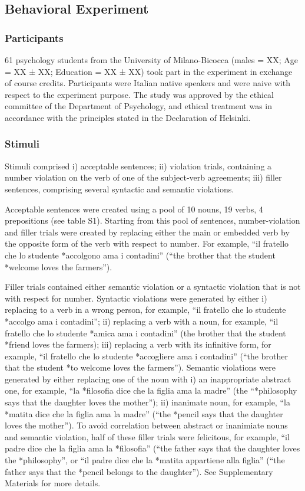 \subsection{Behavioral Experiment}
\subsubsection{Participants}
61 psychology students from the University of Milano-Bicocca (males = XX; Age = XX ± XX; Education = XX ± XX) took part in the experiment in exchange of course credits. Participants were Italian native speakers and were naive with respect to the experiment purpose. The study was approved by the ethical committee of the Department of Psychology, and ethical treatment was in accordance with the principles stated in the Declaration of Helsinki.

\subsubsection{Stimuli}
Stimuli comprised i) acceptable sentences; ii) violation trials, containing a number violation on the verb of one of the subject-verb agreements; iii) filler sentences, comprising several syntactic and semantic violations. 

Acceptable sentences were created using a pool of 10 nouns, 19 verbs, 4 prepositions (see table S1).
Starting from this pool of sentences, number-violation and filler trials were created by replacing either the main or embedded verb by the opposite form of the verb with respect to number. For example, ``il fratello che lo studente *accolgono ama i contadini'' (``the brother that the student *welcome loves the farmers'').

Filler trials contained either semantic violation or a syntactic violation that is not with respect for number. Syntactic violations were generated by either i) replacing to a verb in a wrong person, for example, ``il fratello che lo studente *accolgo ama i contadini''; ii) replacing a verb with a noun, for example, ``il fratello che lo studente *amica ama i contadini'' (the brother that the student *friend loves the farmers); iii) replacing a verb with its infinitive form, for example, ``il fratello che lo studente *accogliere ama i contadini'' (``the brother that the student *to welcome loves the farmers''). Semantic violations were generated by either replacing one of the noun with i) an inappropriate abstract one, for example, ``la *filosofia dice che la figlia ama la madre'' (the ``*philosophy says that the daughter loves the mother''); ii) inanimate noun, for example, ``la *matita dice che la figlia ama la madre'' (``the *pencil says that the daughter loves the mother''). To avoid correlation between abstract or inanimiate nouns and semantic violation, half of these filler trials were felicitous, for example, ``il padre dice che la figlia ama la *filosofia'' (``the father says that the daughter loves the *philosophy'', or ``il padre dice che la *matita appartiene alla figlia'' (``the father says that the *pencil belongs to the daughter''). See Supplementary Materials for more details.

